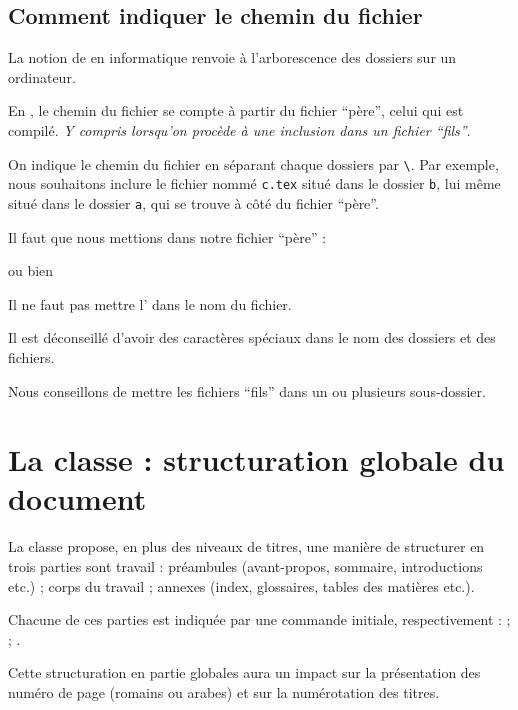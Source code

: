 \subsection{Comment indiquer le chemin du fichier}\label{chemin}

La notion de  en informatique renvoie à l'arborescence des dossiers sur un ordinateur.

En \logiciel{\LaTeX}, le chemin du fichier se compte à partir du fichier \enquote{père}, celui qui est compilé. \emph{Y compris lorsqu'on procède à une inclusion dans un fichier \enquote{fils}}.

On indique le chemin du fichier en séparant chaque dossiers par \verb|\|.  Par exemple, nous souhaitons inclure le fichier nommé \verb|c.tex| situé dans le dossier \verb|b|, lui même situé dans le dossier \verb|a|, qui se trouve à côté du fichier \enquote{père}.

Il faut que nous mettions dans notre fichier \enquote{père} :

\verb||

ou bien

\verb||

\begin{attention}

Il ne faut pas mettre l'  dans le nom du fichier.

Il est déconseillé d'avoir des caractères spéciaux dans le nom des dossiers et des fichiers.
\end{attention}

Nous conseillons de mettre les fichiers \enquote{fils} dans un ou plusieurs sous-dossier.

\section{La classe  : structuration globale du document}

La classe  propose, en plus des niveaux de titres, une manière de structurer en trois parties sont travail : préambules (avant-propos, sommaire, introductions etc.) ; corps du travail ; annexes (index, glossaires, tables des matières etc.). 

Chacune de ces parties est indiquée par une commande initiale, respectivement :  ;  ; .

Cette structuration en partie globales aura un impact sur la présentation des numéro de page (romains ou arabes) et sur la numérotation des titres.

 
